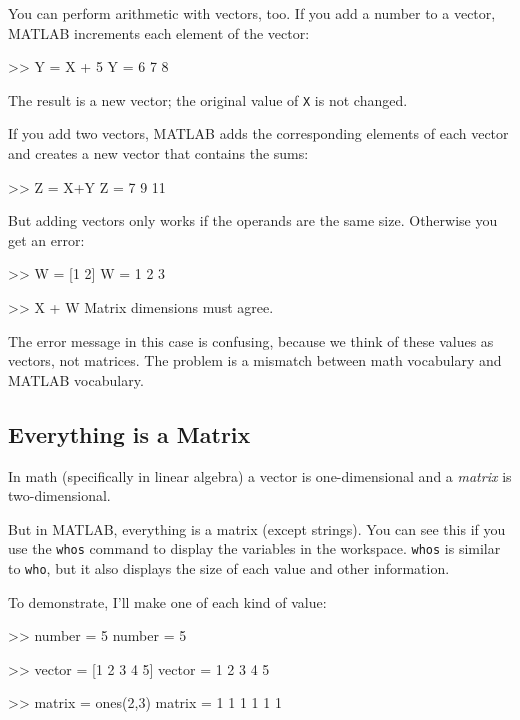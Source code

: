 You can perform arithmetic with vectors, too.  If you add a number
to a vector, MATLAB increments each element of the vector:

\begin{code}
>> Y = X + 5
Y = 6     7     8
\end{code}

The result is a new vector; the original value of {\tt X} is not
changed.

If you add two vectors, MATLAB adds the corresponding elements of each
vector and creates a new vector that contains the sums:

\begin{code}
>> Z = X+Y
Z = 7     9    11
\end{code}

But adding vectors only works if the operands are the same size.
Otherwise you get an error:

\begin{code}
>> W = [1 2]
W = 1     2     3

>> X + W
Matrix dimensions must agree.
\end{code}

The error message in this case is confusing, because we think
of these values as vectors, not matrices.  The problem is a
mismatch between math vocabulary and MATLAB vocabulary.


\subsection{Everything is a Matrix}

In math (specifically in linear algebra) a vector is one-dimensional
and a \emph{matrix} is two-dimensional.


But in MATLAB, everything is a matrix (except strings).
You can see this if you use the {\tt whos} command to display the
variables in the workspace.  {\tt whos} is similar to {\tt who}, but it also displays the size of each value and other information.


To demonstrate, I'll make one of each kind of value:

\begin{code}
>> number = 5
number = 5

>> vector = [1 2 3 4 5]
vector = 1     2     3     4     5

>> matrix = ones(2,3)
matrix =
     1     1     1
     1     1     1
\end{code}


